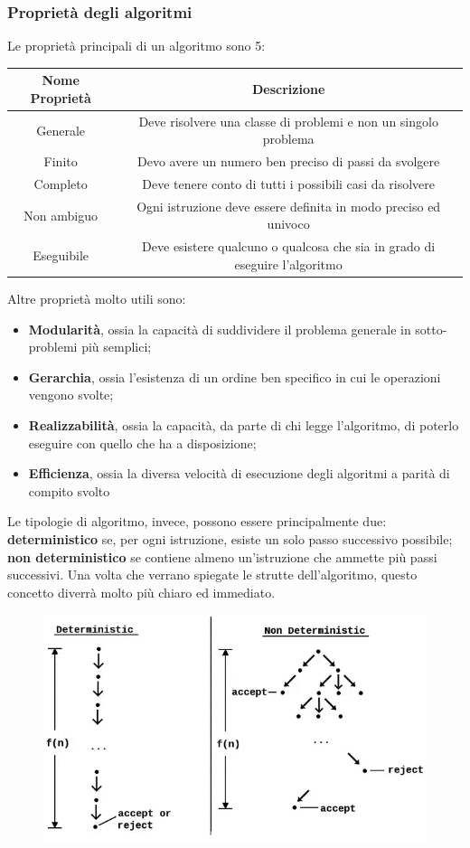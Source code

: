 \documentclass{article}
\begin{document}
	\subsubsection{Proprietà degli algoritmi}
	Le proprietà principali di un algoritmo sono 5:\\
	\begin{center}
		\begin{tabular}{|c|c|}
			\hline
			Nome Proprietà & Descrizione \\ \hline
			Generale & Deve risolvere una classe di problemi e non un singolo problema \\ \hline
			Finito & Devo avere un numero ben preciso di passi da svolgere \\\hline
			Completo & Deve tenere conto di tutti i possibili casi da risolvere \\ \hline
			Non ambiguo & Ogni istruzione deve essere definita in modo preciso ed univoco \\ \hline
			Eseguibile & Deve esistere qualcuno o qualcosa che sia in grado di eseguire l'algoritmo \\ \hline
		\end{tabular}
	\end{center}
	Altre proprietà molto utili sono:
	\begin{itemize}
		\item \textbf{Modularità}, ossia la capacità di suddividere il problema generale in sotto-problemi più semplici;
		\item \textbf{Gerarchia}, ossia l'esistenza di un ordine ben specifico in cui le operazioni vengono svolte;
		\item \textbf{Realizzabilità}, ossia la capacità, da parte di chi legge l'algoritmo, di poterlo eseguire con quello che ha a disposizione;
		\item \textbf{Efficienza}, ossia la diversa velocità di esecuzione degli algoritmi a parità di compito svolto
	\end{itemize}
	Le tipologie di algoritmo, invece, possono essere principalmente due: \textbf{deterministico} se, per ogni istruzione, esiste un solo passo successivo possibile; \textbf{non deterministico} se contiene almeno un'istruzione che ammette più passi successivi. Una volta che verrano spiegate le strutte dell'algoritmo, questo concetto diverrà molto più chiaro ed immediato.
	\begin{figure}[h!]
		\centering
		\includegraphics[scale=1]{Deterministico.png}
	\end{figure}
\end{document}
